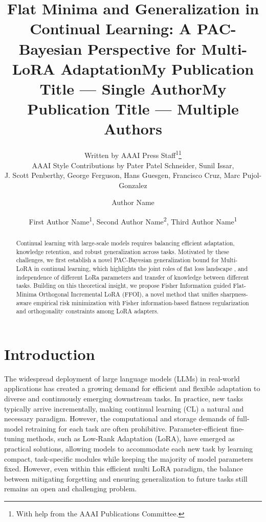 \documentclass[letterpaper]{article} %
\title{Flat Minima and Generalization in Continual Learning: A PAC-Bayesian Perspective for Multi-LoRA Adaptation}
\author{
    Written by AAAI Press Staff\textsuperscript{\rm 1}\thanks{With help from the AAAI Publications Committee.}\\
    AAAI Style Contributions by Pater Patel Schneider,
    Sunil Issar,\\
    J. Scott Penberthy,
    George Ferguson,
    Hans Guesgen,
    Francisco Cruz\equalcontrib,
    Marc Pujol-Gonzalez\equalcontrib
}
\title{My Publication Title --- Single Author}
\author {
    Author Name
}
\title{My Publication Title --- Multiple Authors}
\author {
    First Author Name\textsuperscript{\rm 1},
    Second Author Name\textsuperscript{\rm 2},
    Third Author Name\textsuperscript{\rm 1}
}
\begin{document}
\maketitle

\begin{abstract}
Continual learning with large-scale models requires balancing efficient adaptation, knowledge retention, and robust generalization across tasks. Motivated by these challenges, we first establish a novel PAC-Bayesian generalization bound for Multi-LoRA in continual learning, which highlights the joint roles of flat loss landscape , and independence of different LoRa parameters and transfer of knowledge between different tasks. Building on this theoretical insight, we propose Fisher Information guided Flat-Minima Orthogonal Incremental LoRA (FFOI), a novel method that unifies sharpness-aware empirical risk minimization with Fisher information-based flatness regularization and orthogonality constraints among LoRA adapters.
\end{abstract}



\section{Introduction}

The widespread deployment of large language models (LLMs) in real-world applications has created a growing demand for efficient and flexible adaptation to diverse and continuously emerging downstream tasks. In practice, new tasks typically arrive incrementally, making continual learning (CL) a natural and necessary paradigm. However, the computational and storage demands of full-model retraining for each task are often prohibitive. Parameter-efficient fine-tuning methods, such as Low-Rank Adaptation (LoRA), have emerged as practical solutions, allowing models to accommodate each new task by learning compact, task-specific modules while keeping the majority of model parameters fixed. However, even within this efficient multi LoRA paradigm, the balance between mitigating forgetting and ensuring generalization to future tasks still remains an open and challenging problem.
\end{document}
